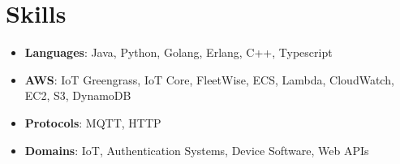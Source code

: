 \documentclass{article}
\begin{document}
\section*{Skills}
\begin{itemize}[leftmargin=*]
    \item \textbf{Languages}: Java, Python, Golang, Erlang, C++, Typescript
    \item \textbf{AWS}: IoT Greengrass, IoT Core, FleetWise, ECS, Lambda, CloudWatch, EC2, S3, DynamoDB
    \item \textbf{Protocols}: MQTT, HTTP
    \item \textbf{Domains}: IoT, Authentication Systems, Device Software, Web APIs
\end{itemize}
\end{document}
